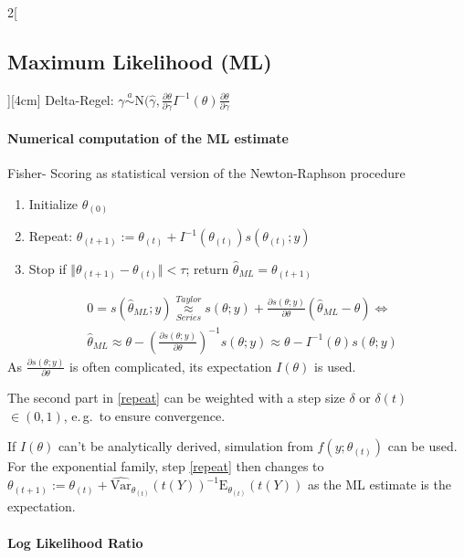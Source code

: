 \documentclass[8pt]{extarticle}
\begin{document}
\begin{multicols}{2}[\subsection{Maximum Likelihood (ML)}][4cm]
\noindent Delta-Regel: $\gamma \overset{a}{\sim} \mathrm{N}(\hat{\gamma}, \frac{\partial \theta}{\partial\gamma} I^{-1}(\theta) \frac{\partial \theta}{\partial\gamma} $

\paragraph{Numerical computation of the ML estimate}
Fisher- Scoring as statistical version of the Newton-Raphson procedure

\begin{enumerate}
\item Initialize $\theta_{(0)}$
\item Repeat: $\theta_{(t+1)} := \theta_{(t)} + I^{-1}(\theta_{(t)})s(\theta_{(t)};y)$ \label{repeat}
\item Stop if $\Vert \theta_{(t+1)} -\theta_{(t)} \Vert < \tau$; return $\hat{\theta}_{ML}=\theta_{(t+1)}$
\end{enumerate}

\begin{Proof}
\vspace{-1.5em}
\begin{align*}
&0 = s(\hat{\theta}_{ML};y) \overset{Taylor}{\underset{Series}{\approx}} s(\theta;y) + \frac{\partial s(\theta;y)}{\partial \theta} (\hat{\theta}_{ML} - \theta) \Leftrightarrow \\
&\hat{\theta}_{ML} \approx \theta - \left(\frac{\partial s(\theta;y)}{\partial \theta}\right)^{-1} s(\theta;y) \approx \theta - I^{-1}(\theta)s(\theta;y)
\end{align*}
As $\frac{\partial s(\theta;y)}{\partial \theta}$ is often complicated, its expectation $I(\theta)$ is used.
\end{Proof}

\noindent The second part in \ref{repeat} can be weighted with a step size $\delta$ or $\delta(t)$ $\in (0,1)$, e.\,g.\ to ensure convergence.

\noindent If $I(\theta)$ can't be analytically derived, simulation from $f(y;\theta_{(t)})$ can be used. For the exponential family, step \ref{repeat} then changes to $\theta_{(t+1)} := \theta_{(t)} + \hat{\mathrm{Var}}_{\theta_{(t)}}(t(Y))^{-1} \mathrm{E}_{\theta_{(t)}}(t(Y))$ as the ML estimate is the expectation.

\paragraph{Log Likelihood Ratio}


\end{multicols}
\end{document}
